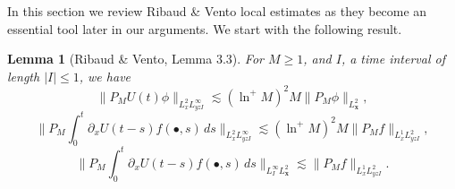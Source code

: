 \documentclass[12pt,letterpaper]{amsart}
\newtheorem{lemma}[theorem]{Lemma}
\theoremstyle{remark}
\numberwithin{equation}{section}
\numberwithin{theorem}{section}
\numberwithin{table}{section}
\begin{document}
In this section we review Ribaud \& Vento \cite{RV} local estimates as they become an essential tool later in our arguments. We start with the following result.

\begin{lemma}[Ribaud \& Vento, Lemma 3.3]
\label{L:RV1}
For $M \geq 1$, and $I$, a time interval of length $|I|\leq 1$, we have 
\begin{equation}
\label{E:HR20}
\| P_M U(t) \phi  \|_{L_x^2 L_{yz I}^\infty} \lesssim (\ln^+ M)^2 M \| P_M \phi \|_{L_{\mathbf{x}}^2},
\end{equation}
\begin{equation}
\label{E:HR21}
\| P_M \int_0^t\partial_x U(t-s)f(\bullet,s) \,ds  \|_{L_x^2 L_{yz I}^\infty} \lesssim (\ln^+ M)^2 M \| P_M f \|_{L_x^1 L_{yzI}^2},
\end{equation}
\begin{equation}
\label{E:HR21b}
\| P_M \int_0^t\partial_x U(t-s)f(\bullet,s) \,ds  \|_{L_I^\infty L_{\mathbf{x}}^2} \lesssim  \| P_M f \|_{L_x^1 L_{yzI}^2}.
\end{equation}
\end{lemma}
\end{document}
